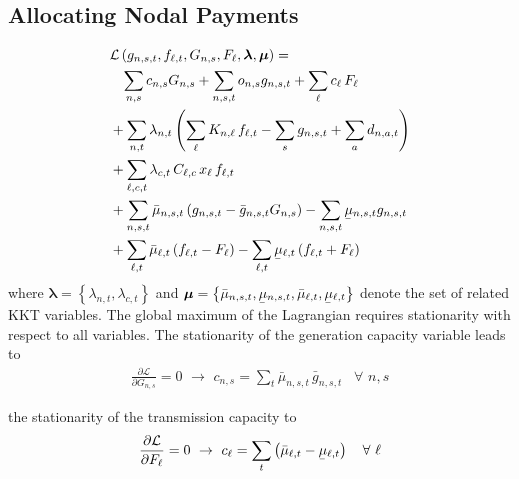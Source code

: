 \documentclass[11pt,twocolumn]{article}
\newcommand{\ubar}[1]{\underaccent{\bar}{#1}}
\newcommand{\generation}[1][n]{g_{#1,s,t}}
\newcommand{\generationpotential}{\bar{g}_{n,s,t}}
\newcommand{\capacityGeneration}{G_{n,s}}
\newcommand{\capacityFlow}{F_{\ell}}
\newcommand{\capexGeneration}{c_{n,s}}
\newcommand{\capexFlow}{c_{\ell}}
\newcommand{\opexGeneration}[1][n]{o_{#1,s}}
\newcommand{\demand}[1][n]{d_{#1,a,t}}
\newcommand{\incidence}[1][n]{K_{#1,\ell}}
\newcommand{\mulowergeneration}[1][n]{\ubar{\mu}_{#1,s,t}}
\newcommand{\muuppergeneration}[1][n]{\bar{\mu}_{#1,s,t}}
\newcommand{\mulowerflow}{\ubar{\mu}_{\ell,t}}
\newcommand{\muupperflow}{\bar{\mu}_{\ell,t}}
\newcommand{\lmp}[1][n]{\lambda_{#1,t}}
\newcommand{\flow}{f_{\ell,t}}
\newcommand{\cycle}{C_{\ell,c}}
\newcommand{\impedance}{x_\ell}
\newcommand{\cycleprice}{\lambda_{c,t}}
\newcommand{\lagrangian}{\mathcal{L}}
\newcommand{\Forall}[1]{\hspace{10pt} \forall \,\, #1 }
\newcommand{\pdv}[2]{\frac{\partial #1}{\partial #2}}
\begin{document}
\subsection{Allocating Nodal Payments}
\begin{align}
\notag
 & \lagrangian\left(\generation, \flow, \capacityGeneration, \capacityFlow, \boldsymbol{\lambda}, \boldsymbol{\mu} \right)   =   \\  
 \notag
 & \;\;\; \sum_{n,s} \capexGeneration \capacityGeneration + \sum_{n, s, t} \opexGeneration \generation + \sum_{\ell} \capexFlow \, \capacityFlow  \\
 \notag
 &+ \sum_{n,t} \lmp \left(\sum_\ell \incidence \, \flow  - \sum_s \generation + \sum_a \demand  \right)  \\ 
 \notag
 &+ \sum_{\ell,c,t} \cycleprice \, \cycle \, \impedance \, \flow  \\
 \notag
 &+ \sum_{n,s,t} \muuppergeneration \left( \generation - \generationpotential \capacityGeneration \right)  - \sum_{n,s,t} \mulowergeneration \generation  \\
 &+ \sum_{\ell,t} \muupperflow \left( \flow - \capacityFlow \right) - \sum_{\ell,t} \mulowerflow \left( \flow + \capacityFlow \right)     
 \label{eq:full_lagrangian}
\end{align}
% 
where $\boldsymbol{\lambda} = \left\lbrace \lmp, \cycleprice \right\rbrace $ and $\boldsymbol{\mu} = \left\lbrace \muuppergeneration, \mulowergeneration, \muupperflow, \mulowerflow \right\rbrace $ denote the set of related KKT variables. The global maximum of the Lagrangian requires stationarity with respect to all variables. The stationarity of the generation capacity variable leads to 
\begin{align}
 \pdv{\lagrangian}{\capacityGeneration}  = 0 \,\, \rightarrow \,\, 
 \capexGeneration =  \sum_t \muuppergeneration \, \generationpotential  \Forall{n,s}
 \label{eq:capexGeneration_duality}
\end{align}

the stationarity of the transmission capacity to
\begin{align}
 \pdv{\lagrangian}{\capacityFlow} = 0 \,\, \rightarrow \,\, 
 \capexFlow =  \sum_t \left( \muupperflow - \mulowerflow \right) \Forall{\ell}
 \label{eq:capexFlow_duality}
\end{align}
\end{document}
